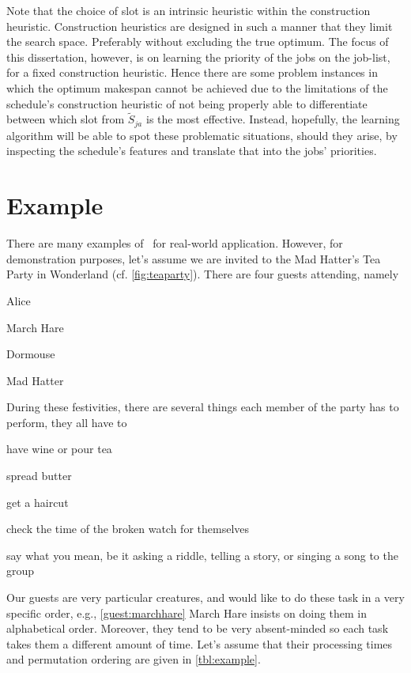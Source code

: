 

Note that the choice of slot is an intrinsic heuristic within the construction heuristic.
Construction heuristics are designed in such a manner that they limit the 
search space. Preferably without excluding the true optimum. The focus of this 
dissertation, however, is on learning the priority of the jobs on the job-list, 
for a fixed construction heuristic. Hence there are some problem instances in 
which the optimum makespan cannot be achieved due to the limitations of the 
schedule's construction heuristic of not being properly able to differentiate 
between which slot from $\tilde{S}_{ja}$ is the most effective. Instead, 
hopefully, the learning algorithm will be able to spot these problematic 
situations, should they arise, by inspecting the schedule's features and 
translate that into the jobs' priorities.

\section{Example}\label{sec:jsp:example}
There are many examples of \jsp\ for real-world application. 
However, for demonstration purposes, let's assume we are invited to the Mad 
Hatter's Tea Party in Wonderland (cf. \cref{fig:teaparty}). 
There are four guests attending, namely
\begin{enumerate*}[label={$J_\arabic*$)}, ref={{$J_\arabic*$}}, 
    itemjoin*={{, and our host }}]
    \item Alice\label{guest:alice}
    \item March Hare\label{guest:marchhare}
    \item Dormouse\label{guest:dormouse}
    \item Mad Hatter\label{guest:madhatter}
\end{enumerate*}
During these festivities, there are several things each member of the party has 
to perform, they all have to
\begin{enumerate*}[label={$M_\arabic*$)}]
    \item have wine or pour tea
    \item spread butter
    \item get a haircut
    \item check the time of the broken watch for themselves
    \item say what you mean, be it asking a riddle, telling a story, or singing 
    a song to the group
\end{enumerate*}
Our guests are very particular creatures, and would like to do these task in a 
very specific order, e.g., \ref{guest:marchhare} March Hare insists on doing 
them in alphabetical order. 
Moreover, they tend to be very absent-minded so each task takes them a 
different amount of time. 
Let's assume that their processing times and permutation ordering are given in 
\cref{tbl:example}.

